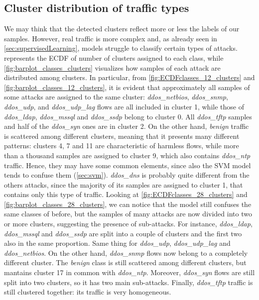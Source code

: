 \documentclass[acmlarge,nonacm]{acmart}
\begin{document}
\subsection{Cluster distribution of traffic types}
We may think that the detected clusters reflect more or less the labels of our samples. However, real traffic is more complex and, as already seen in \cref{sec:supervisedLearning}, models struggle to classify certain types of attacks.  represents the ECDF of number of clusters assigned to each class, while \cref{fig:barplot_classes_clusters} visualizes how samples of each attack are distributed among clusters. In particular, from \cref{fig:ECDFclasses_12_clusters} and \cref{fig:barplot_classes_12_clusters}, it is evident that approximately all samples of some attacks are assigned to the same cluster: \emph{ddos\_netbios}, \emph{ddos\_snmp}, \emph{ddos\_udp}, and \emph{ddos\_udp\_lag} flows are all included in cluster 1, while those of \emph{ddos\_ldap}, \emph{ddos\_mssql} and \emph{ddos\_ssdp} belong to cluster 0. All \emph{ddos\_tftp} samples and half of the \emph{ddos\_syn} ones are in cluster 2. On the other hand, \emph{benign} traffic is scattered among different clusters, meaning that it presents many different patterns: clusters 4, 7 and 11 are characteristic of harmless flows, while more than a thousand samples are assigned to cluster 9, which also contains \emph{ddos\_ntp} traffic. Hence, they may have some common elements, since also the SVM model tends to confuse them (\cref{sec:svm}). \emph{ddos\_dns} is probably quite different from the others attacks, since the majority of its samples are assigned to cluster 1, that contains only this type of traffic. Looking at \cref{fig:ECDFclasses_28_clusters} and \cref{fig:barplot_classes_28_clusters}, we can notice that the model still confuses the same classes of before, but the samples of many attacks are now divided into two or more clusters, suggesting the presence of sub-attacks. For instance, \emph{ddos\_ldap}, \emph{ddos\_mssql} and \emph{ddos\_ssdp} are split into a couple of clusters and the first two also in the same proportion. Same thing for \emph{ddos\_udp}, \emph{ddos\_udp\_lag} and \emph{ddos\_netbios}. On the other hand, \emph{ddos\_snmp} flows now belong to a completely different cluster. The \emph{benign} class is still scattered among different clusters, but mantains cluster 17 in common with \emph{ddos\_ntp}. Moreover, \emph{ddos\_syn} flows are still split into two clusters, so it has two main sub-attacks. Finally, \emph{ddos\_tftp} traffic is still clustered together: its traffic is very homogeneous.
\end{document}
